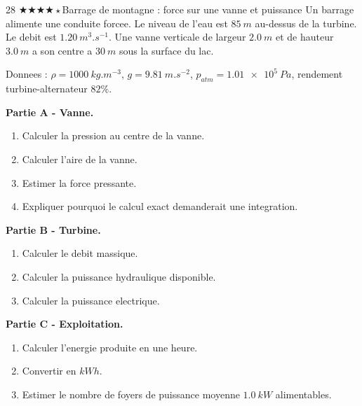 \documentclass[11pt,a4paper]{article}
\newcommand{\difffour}{\(\bigstar\bigstar\bigstar\bigstar\star\)}
\begin{document}
\begin{probleme}{28 \difffour}{Barrage de montagne : force sur une vanne et puissance}
Un barrage alimente une conduite forcee. Le niveau de l'eau est \(\SI{85}{m}\) au-dessus de la turbine. Le debit est \(\SI{1.20}{m^3.s^{-1}}\). Une vanne verticale de largeur \(\SI{2.0}{m}\) et de hauteur \(\SI{3.0}{m}\) a son centre a \(\SI{30}{m}\) sous la surface du lac.

Donnees : \(\rho=\SI{1000}{kg.m^{-3}}\), \(g=\SI{9.81}{m.s^{-2}}\), \(p_{atm}=\SI{1.01e5}{Pa}\), rendement turbine-alternateur \(82\%\).

\textbf{Partie A - Vanne.}
\begin{enumerate}
\item Calculer la pression au centre de la vanne.
\item Calculer l'aire de la vanne.
\item Estimer la force pressante.
\item Expliquer pourquoi le calcul exact demanderait une integration.
\end{enumerate}

\textbf{Partie B - Turbine.}
\begin{enumerate}[resume]
\item Calculer le debit massique.
\item Calculer la puissance hydraulique disponible.
\item Calculer la puissance electrique.
\end{enumerate}

\textbf{Partie C - Exploitation.}
\begin{enumerate}[resume]
\item Calculer l'energie produite en une heure.
\item Convertir en \(\si{kWh}\).
\item Estimer le nombre de foyers de puissance moyenne \(\SI{1.0}{kW}\) alimentables.
\end{enumerate}
\end{probleme}
\end{document}
